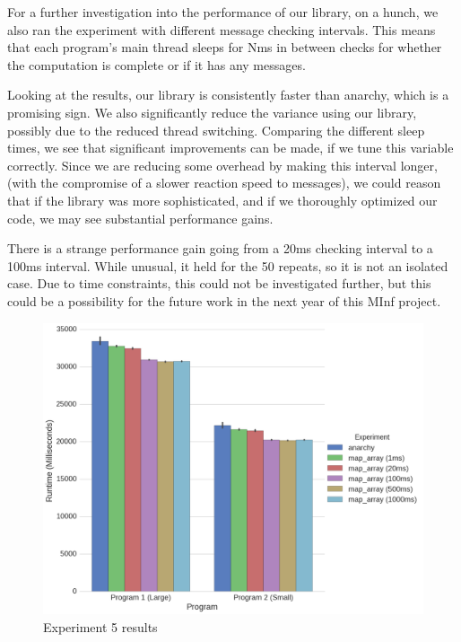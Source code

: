 For a further investigation into the performance of our library, on a hunch, we also ran the experiment with different message checking intervals. This means that each program's main thread sleeps for Nms in between checks for whether the computation is complete or if it has any messages.

Looking at the results, our library is consistently faster than anarchy, which is a promising sign. We also significantly reduce the variance using our library, possibly due to the reduced thread switching. Comparing the different sleep times, we see that significant improvements can be made, if we tune this variable correctly. Since we are reducing some overhead by making this interval longer, (with the compromise of a slower reaction speed to messages), we could reason that if the library was more sophisticated, and if we thoroughly optimized our code, we may see substantial performance gains.

There is a strange performance gain going from a 20ms checking interval to a 100ms interval. While unusual, it held for the 50 repeats, so it is not an isolated case. Due to time constraints, this could not be investigated further, but this could be a possibility for the future work in the next year of this MInf project.



\begin{figure}
	\centering
	\includegraphics[width=\textwidth]{graphics/experiment5.png}
	\caption{Experiment 5 results}
	\label{fig:results_ex5}
\end{figure}

